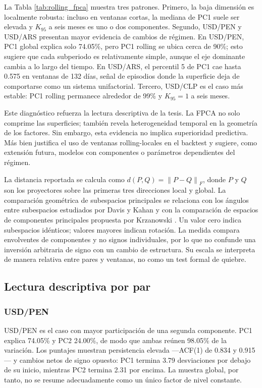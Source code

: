 \documentclass[a4paper,11pt]{article}
\newcommand{\norm}[1]{\left\lVert #1 \right\rVert}
\begin{document}
La Tabla \ref{tab:rolling_fpca} muestra tres patrones. Primero, la baja dimensión es localmente robusta: incluso en ventanas cortas, la mediana de PC1 suele ser elevada y \(K_{95}\) a seis meses es uno o dos componentes. Segundo, USD/PEN y USD/ARS presentan mayor evidencia de cambios de régimen. En USD/PEN, PC1 global explica solo 74.05\%, pero PC1 rolling se ubica cerca de 90\%; esto sugiere que cada subperiodo es relativamente simple, aunque el eje dominante cambia a lo largo del tiempo. En USD/ARS, el percentil 5 de PC1 cae hasta 0.575 en ventanas de 132 días, señal de episodios donde la superficie deja de comportarse como un sistema unifactorial. Tercero, USD/CLP es el caso más estable: PC1 rolling permanece alrededor de 99\% y \(K_{95}=1\) a seis meses.

Este diagnóstico refuerza la lectura descriptiva de la tesis. La FPCA no solo comprime las superficies; también revela heterogeneidad temporal en la geometría de los factores. Sin embargo, esta evidencia no implica superioridad predictiva. Más bien justifica el uso de ventanas rolling-locales en el backtest y sugiere, como extensión futura, modelos con componentes o parámetros dependientes del régimen.

La distancia reportada se calcula como \(d(P,Q)=\norm{P-Q}_F\), donde \(P\) y \(Q\) son los proyectores sobre las primeras tres direcciones local y global. La comparación geométrica de subespacios principales se relaciona con los ángulos entre subespacios estudiados por Davis y Kahan \cite{DavisKahan1970} y con la comparación de espacios de componentes principales propuesta por Krzanowski \cite{Krzanowski1979}. Un valor cero indica subespacios idénticos; valores mayores indican rotación. La medida compara envolventes de componentes y no signos individuales, por lo que no confunde una inversión arbitraria de signo con un cambio de estructura. Su escala se interpreta de manera relativa entre pares y ventanas, no como un test formal de quiebre.

\subsection{Lectura descriptiva por par}

\subsubsection{USD/PEN}

USD/PEN es el caso con mayor participación de una segunda componente. PC1 explica 74.05\% y PC2 24.00\%, de modo que ambas reúnen 98.05\% de la variación. Los puntajes muestran persistencia elevada ---ACF(1) de 0.834 y 0.915--- y cambios netos de signo opuesto: PC1 termina 3.79 desviaciones por debajo de su inicio, mientras PC2 termina 2.31 por encima. La muestra global, por tanto, no se resume adecuadamente como un único factor de nivel constante.
\end{document}

